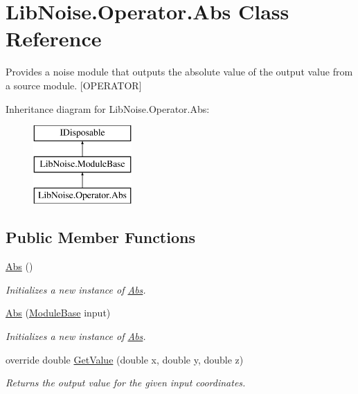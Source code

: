 \hypertarget{class_lib_noise_1_1_operator_1_1_abs}{}\section{Lib\+Noise.\+Operator.\+Abs Class Reference}
\label{class_lib_noise_1_1_operator_1_1_abs}


Provides a noise module that outputs the absolute value of the output value from a source module. \mbox{[}O\+P\+E\+R\+A\+T\+OR\mbox{]}  


Inheritance diagram for Lib\+Noise.\+Operator.\+Abs\+:\begin{figure}[H]
\begin{center}
\leavevmode
\includegraphics[height=3.000000cm]{class_lib_noise_1_1_operator_1_1_abs}
\end{center}
\end{figure}
\subsection*{Public Member Functions}
\begin{DoxyCompactItemize}
\item 
\hyperlink{class_lib_noise_1_1_operator_1_1_abs_a3db6904f2e7b23215c83bffe4429c47d}{Abs} ()
\begin{DoxyCompactList}\small\item\em Initializes a new instance of \hyperlink{class_lib_noise_1_1_operator_1_1_abs}{Abs}. \end{DoxyCompactList}\item 
\hyperlink{class_lib_noise_1_1_operator_1_1_abs_ad3431fe63d7758693a4b1d92baf0e0ea}{Abs} (\hyperlink{class_lib_noise_1_1_module_base}{Module\+Base} input)
\begin{DoxyCompactList}\small\item\em Initializes a new instance of \hyperlink{class_lib_noise_1_1_operator_1_1_abs}{Abs}. \end{DoxyCompactList}\item 
override double \hyperlink{class_lib_noise_1_1_operator_1_1_abs_a333592d3dab0c19b2ec6788db66c2948}{Get\+Value} (double x, double y, double z)
\begin{DoxyCompactList}\small\item\em Returns the output value for the given input coordinates. \end{DoxyCompactList}\end{DoxyCompactItemize}
